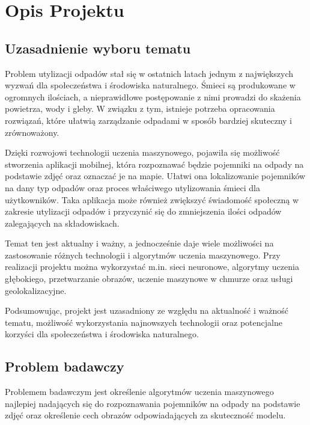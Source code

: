 \documentclass[12pt, a4paper, twoside, openany]{book}
\begin{document}
\section{Opis Projektu}

\subsection{Uzasadnienie wyboru tematu}

Problem utylizacji odpadów stał się w ostatnich latach jednym z największych wyzwań dla społeczeństwa i środowiska naturalnego. Śmieci są produkowane w ogromnych ilościach, a nieprawidłowe postępowanie z nimi prowadzi do skażenia powietrza, wody i gleby. W związku z tym, istnieje potrzeba opracowania rozwiązań, które ułatwią zarządzanie odpadami w sposób bardziej skuteczny i zrównoważony.

Dzięki rozwojowi technologii uczenia maszynowego, pojawiła się możliwość stworzenia aplikacji mobilnej, która rozpoznawać będzie pojemniki na odpady na podstawie zdjęć oraz oznaczać je na mapie. Ułatwi ona lokalizowanie pojemników na dany typ odpadów oraz proces właściwego utylizowania śmieci dla użytkowników. Taka aplikacja może również zwiększyć świadomość społeczną w zakresie utylizacji odpadów i przyczynić się do zmniejszenia ilości odpadów zalegających na składowiskach.

Temat ten jest aktualny i ważny, a jednocześnie daje wiele możliwości na zastosowanie różnych technologii i algorytmów uczenia maszynowego. Przy realizacji projektu można wykorzystać m.in. sieci neuronowe, algorytmy uczenia głębokiego, przetwarzanie obrazów, uczenie maszynowe w chmurze oraz usługi geolokalizacyjne.

Podsumowując, projekt \topic jest uzasadniony ze względu na aktualność i ważność tematu, możliwość wykorzystania najnowszych technologii oraz potencjalne korzyści dla społeczeństwa i środowiska naturalnego.

\subsection{Problem badawczy}

Problemem badawczym jest określenie algorytmów uczenia maszynowego najlepiej nadających się do rozpoznawania pojemników na odpady na podstawie zdjęć oraz określenie cech obrazów odpowiadających za skuteczność modelu.
\end{document}
